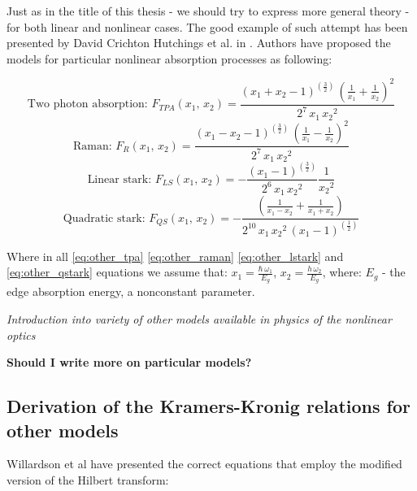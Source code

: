 \documentclass[12pt,twoside,a4paper]{article}
\numberwithin{equation}{subsection}
\numberwithin{figure}{subsection}
\begin{document}
Just as in the title of this thesis - we should try to express more general theory - for both linear and nonlinear cases. The good
example of such attempt has been presented by David Crichton Hutchings et al. in \cite{hutchings_kramers2}. Authors have proposed the models
for particular nonlinear absorption processes as following:   

\begin{equation} \label{eq:other_tpa}
  \mbox{Two photon absorption: } F_{TPA} ({x_{1}}, \,{x_{2}}) = \frac {({x_{1}} + {x_{2}} - 1)^{(\frac {3}{2})}\,(\frac
  {1}{{x_{1}}} + \frac {1}{{x_{2}}}) ^{2}} {2^{7}\,{x_{1}}\,{x_{2}}^{2}}
\end{equation}
\begin{equation} \label{eq:other_raman}
  \mbox{Raman: } {F_{R}}({x_{1}}, \,{x_{2}})=\frac {({x_{1}} - {x_{2}} - 1)^{(\frac {3}{2})}\,(\frac {1}{{x_{1}}} - \frac
  {1}{{x_{2}}})^{2}}{2^{7}\,{x_{1}}\,{x_{2}}^{2}}
\end{equation}
\begin{equation} \label{eq:other_lstark}
  \mbox{Linear stark: } {F_{LS}}({x_{1}}, \,{x_{2}})= - \frac {({x_{1}} - 1)^{(\frac {3}{2})}}{2^{6}\,{x_{1}}\,{x_{2}}^{2}} \frac
  {1}{{x_{2}}^{2}}
\end{equation}
\begin{equation} \label{eq:other_qstark}
  \mbox{Quadratic stark: } {F_{QS}}({x_{1}}, \,{x_{2}})= - \frac {(\frac {1}{{x_{1}} - {x_{2}}} + \frac {1}{{x_{1}} +
  {x_{2}}})}{2^{10}\, {x_{1}}\,{x_{2}}^{2}\,({x_{1}} - 1)^{(\frac {1}{2})}}
\end{equation}

Where in all \ref{eq:other_tpa} \ref{eq:other_raman} \ref{eq:other_lstark} and \ref{eq:other_qstark} equations we assume that:
${x_{1}}=\frac {\hbar\,{\omega_{1}}}{{E_{g}}}$, ${x_{2}}=\frac {h\,{\omega_{2}}}{{E_{g}}}$, where: ${E_{g}}$ - the edge absorption
energy, a nonconstant parameter.


\textit{Introduction into variety of other models available in physics of the nonlinear optics}

\textbf{Should I write more on particular models?}

\subsection{Derivation of the Kramers-Kronig relations for other models} \label{chap:problem_dother}


Willardson et al \cite{willardson_semiconductors} have presented the correct equations that employ the modified version of
the Hilbert transform:
\end{document}
